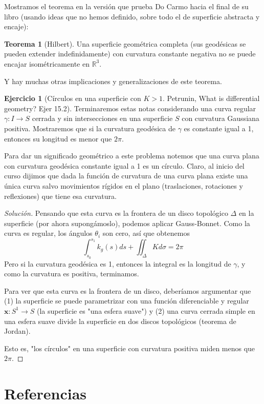 \documentclass[spanish]{book}
\theoremstyle{definition}
\newtheorem*{teo}{Teorema}
\newtheorem*{ejer}{Ejercicio}
\newcommand{\R}{\mathbb{R}}
\begin{document}
Mostramos el teorema en la versión que prueba Do Carmo hacia el final de su libro (usando ideas que no hemos definido, sobre todo el de superficie abstracta y encaje):
\begin{teo}[Hilbert]
	Una superficie geométrica completa (sus geodésicas se pueden extender indefinidamente) con curvatura constante negativa no se puede encajar isométricamente en $\R^3$.
\end{teo}
Y hay muchas otras implicaciones y generalizaciones de este teorema.
\begin{ejer}[Círculos en una superficie con $K>1$. Petrunin, What is differential geometry? Ejer 15.2]
	Terminaremos estas notas considerando una curva regular $\gamma:I\to S$ cerrada y sin intersecciones en una superficie $S$ con curvatura Gaussiana positiva. Mostraremos que si la curvatura geodésica de $\gamma$ es constante igual a 1, entonces su longitud es menor que $2\pi$.
	
	Para dar un significado geométrico a este problema notemos que una curva plana con curvatura geodésica constante igual a 1 es un círculo. Claro, al inicio del curso dijimos que dada la función de curvatura de una curva plana existe una única curva salvo movimientos rígidos en el plano (traslaciones, rotaciones y reflexiones) que tiene esa curvatura.
\end{ejer}
\begin{proof}[Solución]
	Pensando que esta curva es la frontera de un disco topológico $\Delta$ en la superficie (por ahora supongámoslo), podemos aplicar Gauss-Bonnet. Como la curva es regular, los ángulos $\theta_i$ son cero, así que obtenemos
	\[\int_{s_0}^{s_1} k_g(s)ds+\iint_\Delta Kd\sigma=2\pi\]
	Pero si la curvatura geodésica es 1, entonces la integral es la longitud de $\gamma$, y como la curvatura es positiva, terminamos.
	
	Para ver que esta curva es la frontera de un disco, deberíamos argumentar que (1) la superficie se puede parametrizar con una función diferenciable y regular $\mathbf x:S^1\to S$ (la superficie es "una esfera suave") y (2) una curva cerrada simple en una esfera suave divide la superficie en dos discos topológicos (teorema de Jordan).
	
	Esto es, "los círculos" en una superficie con curvatura positiva miden menos que $2\pi$.\nocite{DoCarmo}
\end{proof}
\chapter{Referencias}
\printbibliography
\end{document}
